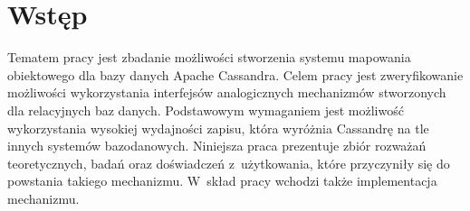 
\chapter{Wstęp}

Tematem pracy jest zbadanie możliwości stworzenia systemu mapowania obiektowego dla bazy danych Apache Cassandra. Celem pracy jest zweryfikowanie możliwości wykorzystania interfejsów analogicznych mechanizmów stworzonych dla relacyjnych baz danych. Podstawowym wymaganiem jest możliwość wykorzystania wysokiej wydajności zapisu, która wyróżnia Cassandrę na tle innych systemów bazodanowych. Niniejsza praca prezentuje zbiór rozważań teoretycznych, badań oraz doświadczeń z~użytkowania, które przyczyniły się do powstania takiego mechanizmu. W~skład pracy wchodzi także implementacja mechanizmu.



